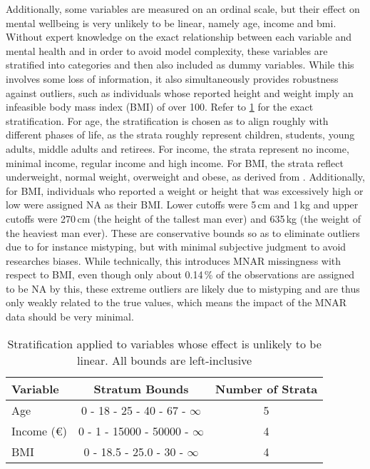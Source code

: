 Additionally, some variables are measured on an ordinal scale, but their effect on mental wellbeing is very unlikely to
be linear, namely age, income and bmi. Without expert knowledge on the exact relationship between each variable
and mental health and in order to avoid model complexity, these variables are stratified into categories and then also
included as dummy variables. While this involves some loss of information, it also simultaneously provides robustness
against outliers, such as individuals whose reported height and weight imply an infeasible body mass index (BMI) of over 100.
Refer to \cref{tab:data:stratification} for the exact stratification.
For age, the stratification is chosen as to align roughly with different phases of life, as the strata roughly represent
children, students, young adults, middle adults and retirees.
For income, the strata represent no income, minimal income, regular income and high income.
For BMI, the strata reflect underweight, normal weight, overweight and obese, as derived from .
Additionally, for BMI, individuals who reported a weight or height that was excessively high or low were assigned NA as their BMI.
Lower cutoffs were 5\,cm and 1\,kg and upper cutoffs were 270\,cm (the height of the tallest man ever) and 635\,kg
(the weight of the heaviest man ever). These are conservative bounds so as to eliminate outliers due to for instance
mistyping, but with minimal subjective judgment to avoid researches biases.
While technically, this introduces MNAR missingness with respect to BMI, even though only about 0.14\,\% of the observations are
assigned to be NA by this, these extreme outliers are likely due to mistyping and are thus only weakly related to the
true values, which means the impact of the MNAR data should be very minimal.

\begin{table}[htbp]
    \centering
    \caption{Stratification applied to variables whose effect is unlikely to be linear. All bounds are left-inclusive}
    \label{tab:data:stratification}
    \begin{tabular}{l|c|c}
        Variable & Stratum Bounds & Number of Strata \\
        \hline
        Age        & 0 \hfill- \hfill18 \hfill- \hfill25 \hfill- \hfill40 \hfill- \hfill67 \hfill- \hfill$ \infty$ & 5  \\
        Income (€) & 0 \hfill- \hfill1 \hfill- \hfill15000 \hfill- \hfill50000 \hfill- \hfill$ \infty$ & 4  \\
        BMI        & 0 \hfill- \hfill18.5 \hfill- \hfill25.0 \hfill- \hfill30 \hfill- \hfill$ \infty$  & 4  \\
    \end{tabular}
\end{table}

